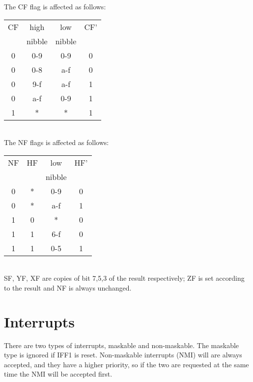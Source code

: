 \documentclass[twoside,openright,a4paper]{book}
\begin{document}

The CF flag is affected as follows:

\begin{tabular}{c|c|c|c}
	CF & high   & low    & CF' \\
	& nibble & nibble &     \\ 	
	\hline
	0 & 0-9    & 0-9    &  0  \\
	0 & 0-8    & a-f    &  0  \\
	0 & 9-f    & a-f    &  1  \\
	0 & a-f    & 0-9    &  1  \\
	1 &  *     &  *     &  1  \\ 
	\hline
\end{tabular}\\[1ex]


The NF flags is affected as follows:
 
\begin{tabular}{c|c|c|c}
	NF & HF & low    & HF' \\
	&    & nibble &     \\ 
	\hline
	0 &  * & 0-9    &  0  \\
	0 &  * & a-f    &  1  \\
	1 &  0 &  *     &  0  \\
	1 &  1 & 6-f    &  0  \\
	1 &  1 & 0-5    &  1  \\ 
	\hline
\end{tabular}\\[1ex]


SF, YF, XF are copies of bit 7,5,3 of the result respectively; ZF is set according to the result and NF is always unchanged.




\section{Interrupts}
\label{interrupts}

There are two types of interrupts, maskable and non-maskable. The maskable type is ignored if IFF1 is reset. Non-maskable interrupts (NMI) will are always accepted, and they have a higher priority, so if the two are requested at the same time the NMI will be accepted first.
\end{document}
